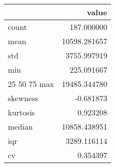 \begin{tabular}{lr}
\toprule
 & value \\
\midrule
count & 187.000000 \\
mean & 10598.281657 \\
std & 3755.997919 \\
min & 225.091667 \\
25%
50%
75%
max & 19485.344780 \\
skewness & -0.681873 \\
kurtosis & 0.923208 \\
median & 10858.438951 \\
iqr & 3289.116114 \\
cv & 0.354397 \\
\bottomrule
\end{tabular}
